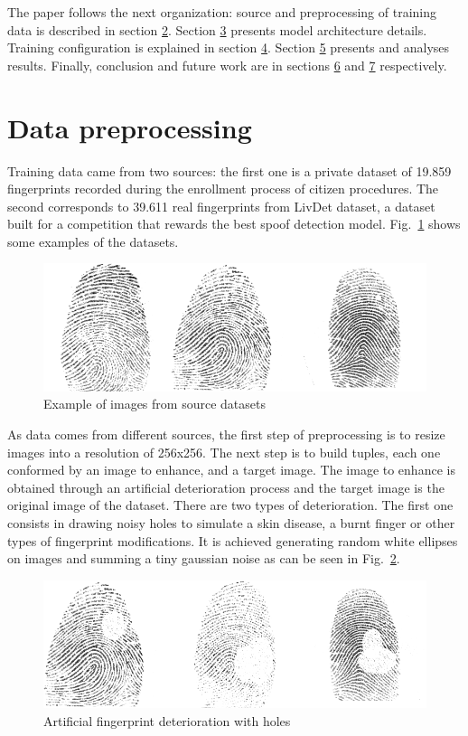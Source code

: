 \documentclass[a4paper,fleqn]{cas-dc}
\begin{document}
The paper follows the next organization: source and preprocessing of training data is described in section \hyperref[sec:DP]{2}. Section \hyperref[sec:MA]{3} presents model architecture details. Training configuration is explained in section \hyperref[sec:MT]{4}. Section \hyperref[sec:R]{5} presents and analyses results. Finally, conclusion and future work are in sections \hyperref[sec:FW]{6} and \hyperref[sec:FW]{7} respectively.
     
\section{Data preprocessing}
\label{sec:DP}

Training data came from two sources: the first one is a private dataset of 19.859 fingerprints recorded during the enrollment process of citizen procedures. The second corresponds to 39.611 real fingerprints from LivDet dataset, a dataset built for a competition that rewards the best spoof detection model. Fig.~\ref{fig1} shows some examples of the datasets.

\begin{figure}[htbp]
\centerline{\includegraphics[scale=0.3]{figs/dataset_example.png}}
\caption{Example of images from source datasets}
\label{fig1}
\end{figure}

As data comes from different sources, the first step of preprocessing is to resize images into a resolution of 256x256. The next step is to build tuples, each one conformed by an image to enhance, and a target image. The image to enhance is obtained through an artificial deterioration process and the target image is the original image of the dataset. There are two types of deterioration. The first one consists in drawing noisy holes to simulate a skin disease, a burnt finger or other types of fingerprint modifications. It is achieved generating random white ellipses on images and summing a tiny gaussian noise as can be seen in Fig.~\ref{fig2}.

\begin{figure}[htbp]
\centerline{\includegraphics[scale=0.3]{figs/deterioration_1.png}}
\caption{Artificial fingerprint deterioration with holes}
\label{fig2}
\end{figure}
\end{document}
